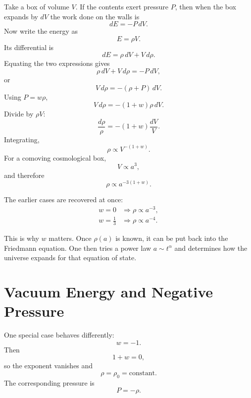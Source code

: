 Take a box of volume \(V\). If the contents exert pressure \(P\), then when the box expands by \(dV\) the work done on the walls is
\begin{equation}
dE=-P\,dV.
\end{equation}
Now write the energy as
\begin{equation}
E=\rho V.
\end{equation}
Its differential is
\begin{equation}
dE=\rho\,dV+V\,d\rho .
\end{equation}
Equating the two expressions gives
\begin{equation}
\rho\,dV+V\,d\rho=-P\,dV,
\end{equation}
or
\begin{equation}
V\,d\rho=-(\rho+P)\,dV.
\end{equation}
Using \(P=w\rho\),
\begin{equation}
V\,d\rho=-(1+w)\rho\,dV.
\end{equation}
Divide by \(\rho V\):
\begin{equation}
\frac{d\rho}{\rho}=-(1+w)\frac{dV}{V}.
\end{equation}
Integrating,
\begin{equation}
\rho \propto V^{-(1+w)}.
\end{equation}
For a comoving cosmological box,
\begin{equation}
V\propto a^3,
\end{equation}
and therefore
\begin{equation}
\rho \propto a^{-3(1+w)}.
\end{equation}

The earlier cases are recovered at once:
\begin{align}
w=0 &\Longrightarrow \rho \propto a^{-3},\\
w=\frac{1}{3} &\Longrightarrow \rho \propto a^{-4}.
\end{align}

This is why \(w\) matters. Once \(\rho(a)\) is known, it can be put back into the Friedmann equation. One then tries a power law \(a\sim t^\alpha\) and determines how the universe expands for that equation of state.

\section{Vacuum Energy and Negative Pressure}

One special case behaves differently:
\begin{equation}
w=-1.
\end{equation}
Then
\begin{equation}
1+w=0,
\end{equation}
so the exponent vanishes and
\begin{equation}
\rho=\rho_0=\text{constant}.
\end{equation}
The corresponding pressure is
\begin{equation}
P=-\rho .
\end{equation}

